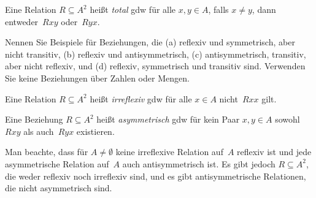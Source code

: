 \documentclass[../../../include/open-logic-section]{subfiles}
\begin{document}
\begin{defn}[Totalität]
Eine Relation $R \subseteq A^2$ heißt \emph{total} gdw für alle $x,y\in
A$, falls $x \neq y$, dann entweder~$Rxy$ oder~$Ryx$.
\end{defn}

\begin{prob}
Nennen Sie Beispiele für Beziehungen, die (a) reflexiv und symmetrisch, aber
nicht transitiv, (b) reflexiv und antisymmetrisch, (c) antisymmetrisch,
transitiv, aber nicht reflexiv, und (d) reflexiv, symmetrisch und
transitiv sind.  Verwenden Sie keine Beziehungen über Zahlen oder Mengen.
\end{prob} 
 
\begin{defn}[Irreflexivität]
Eine Relation $R \subseteq A^2$ heißt \emph{irreflexiv} gdw für alle $x \in
A$ nicht~$Rxx$ gilt. 
\end{defn}

\begin{defn}[Asymmetrie]
Eine Beziehung $R \subseteq A^2$ heißt \emph{asymmetrisch} gdw für kein Paar $x,y\in
A$ sowohl $Rxy$ als auch~$Ryx$ existieren. 
\end{defn}

Man beachte, dass für $A \neq \emptyset$ keine irreflexive Relation auf~$A$
reflexiv ist und jede asymmetrische Relation auf~$A$ auch
antisymmetrisch ist. Es gibt jedoch $R \subseteq A^2$, die weder
reflexiv noch irreflexiv sind, und es gibt antisymmetrische
Relationen, die nicht asymmetrisch sind. 
\end{document}
